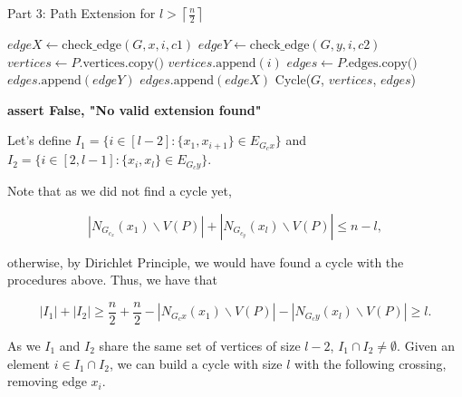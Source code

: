 \begin{algorithm}[H]
    \caption{Part 3: Path Extension for \( l > \left \lceil \frac{n}{2} \right \rceil \)}
    \begin{algorithmic}
            \For{$[c1, c2] \in [[cx, cy], [cy, cx]]$} 
                     
                        \State $edgeX \gets \text{check\_edge}(G, x, i, c1)$
                        \State $edgeY \gets \text{check\_edge}(G, y, i, c2)$
                            \State $vertices \gets P.\text{vertices.copy()}$
                            \State $vertices.\text{append}(i)$
                            \State $edges \gets P.\text{edges.copy()}$
                            \State $edges.\text{append}(edgeY)$
                            \State $edges.\text{append}(edgeX)$
                            \State \Return Cycle($G$, $vertices$, $edges$) 
                        \EndIf
                    \EndIf
                \EndFor
            \EndFor

            \State \textbf{assert False, "No valid extension found"}
        \EndFunction
    \end{algorithmic}
\end{algorithm}

Let's define $I_1 = \{i \in [l - 2]: \{x_1, x_{i + 1}\} \in E_{G_cx}\}$ and 
$I_2 = \{i \in [2, l - 1]: \{x_i, x_{l}\} \in E_{G_cy}\}$.

Note that as we did not find a cycle yet, 

$$
|N_{G_{c_x}}(x_1) \backslash V(P)| + |N_{G_{c_y}}(x_l) \backslash V(P)| \leq n - l,
$$

otherwise, by Dirichlet Principle, we would have found a cycle
with the procedures above. Thus, we have that

$$
|I_1| + |I_2| \geq \frac{n}{2} + \frac{n}{2} - |N_{G_cx}(x_1) \backslash V(P)| - |N_{G_cy}(x_l) \backslash V(P)| \geq l.
$$

As we $I_1$ and $I_2$ share the same set of vertices of size
$l - 2$, $I_1 \cap I_2 \neq \emptyset$. Given an element
$i \in I_1 \cap I_2$, we can build a cycle with size $l$ with
the following crossing, removing edge $x_i$.

